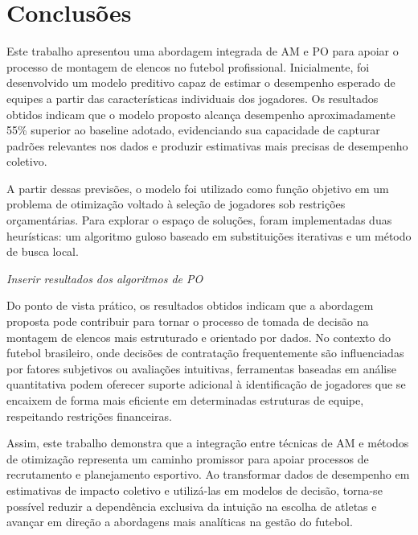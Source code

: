 \section{Conclusões}

Este trabalho apresentou uma abordagem integrada de AM e PO para apoiar o processo de montagem de elencos no futebol profissional. 
Inicialmente, foi desenvolvido um modelo preditivo capaz de estimar o desempenho esperado de equipes a partir das características individuais dos jogadores. 
Os resultados obtidos indicam que o modelo proposto alcança desempenho aproximadamente 55\% superior ao baseline adotado, evidenciando sua capacidade de capturar 
padrões relevantes nos dados e produzir estimativas mais precisas de desempenho coletivo.

A partir dessas previsões, o modelo foi utilizado como função objetivo em um problema de otimização voltado à seleção de jogadores sob restrições orçamentárias. 
Para explorar o espaço de soluções, foram implementadas duas heurísticas: um algoritmo guloso baseado em substituições iterativas e um método de busca local.

\textit{Inserir resultados dos algoritmos de PO}

Do ponto de vista prático, os resultados obtidos indicam que a abordagem proposta pode contribuir para tornar o processo de tomada de decisão na montagem de 
elencos mais estruturado e orientado por dados. No contexto do futebol brasileiro, onde decisões de contratação frequentemente são influenciadas por fatores 
subjetivos ou avaliações intuitivas, ferramentas baseadas em análise quantitativa podem oferecer suporte adicional à identificação de jogadores que se encaixem 
de forma mais eficiente em determinadas estruturas de equipe, respeitando restrições financeiras.

Assim, este trabalho demonstra que a integração entre técnicas de AM e métodos de otimização representa um caminho promissor para apoiar 
processos de recrutamento e planejamento esportivo. Ao transformar dados de desempenho em estimativas de impacto coletivo e utilizá-las em modelos de decisão, 
torna-se possível reduzir a dependência exclusiva da intuição na escolha de atletas e avançar em direção a abordagens mais analíticas na gestão do futebol.